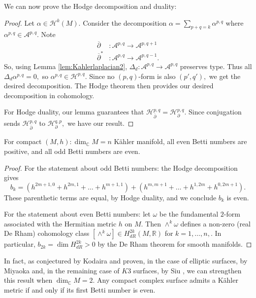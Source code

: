 \noindent We can now prove the Hodge decomposition and duality:

\begin{proof}
    Let $\alpha \in \mathcal{H}^k(M).$ Consider the decomposition $\alpha = \sum_{p+q = k} \alpha^{p,q}$ where $\alpha^{p,q} \in \mathcal{A}^{p,q}.$ Note
    \begin{align*}
    \overline\partial &: \mathcal{A}^{p,q} \rightarrow \mathcal{A}^{p,q+1}\\
    \overline\partial^* &: \mathcal{A}^{p,q} \rightarrow \mathcal{A}^{p,q-1}.
    \end{align*}
    So, using Lemma \ref{lem:Kahlerlaplacian2}, $\Delta_d:\mathcal{A}^{p,q} \rightarrow \mathcal{A}^{p,q}$ preserves type. Thus all $\Delta_d \alpha^{p,q} = 0,$ so $\alpha^{p,q}\in \mathcal{H}^{p,q}.$ Since no $(p,q)$-form is also $(p',q'),$ we get the desired decomposition. The Hodge theorem then provides our desired decomposition in cohomology.

    For Hodge duality, our lemma guarantees that $\mathcal{H}^{p,q}_{\overline\partial} = \mathcal{H}^{p,q}_{\partial}.$ Since conjugation sends $\mathcal{H}^{p,q}_{\overline\partial}$ to $\mathcal{H}^{q,p}_{\partial},$ we have our result.
\end{proof}


\begin{theorem}\label{thm:Betti}
    For compact $(M,h): \dim_\mathbb{C} M= n$ K\"ahler manifold, all even Betti numbers are positive, and all odd Betti numbers are even.
\end{theorem}

\begin{proof}
    For the statement about odd Betti numbers: the Hodge decomposition gives
    \[
    b_k = (h^{2m + 1, 0} + h^{2m, 1} + \dots + h^{m+1, 1}) + (h^{m,m+1} + \dots + h^{1, 2m} + h^{0,2m+1}).
    \]
    These parenthetic terms are equal, by Hodge duality, and we conclude $b_k$ is even.

    For the statement about even Betti numbers: let $\omega$ be the fundamental $2$-form associated with the Hermitian metric $h$ on $M.$ Then $\wedge^k \omega$ defines a non-zero (real De Rham) cohomology class $[\wedge^k \omega] \in H^{2k}_{dR}(M, \mathbb{R})$ for $k = 1, \dots, n,.$ In particular, $b_{2k} = \dim H^{2k}_{dR}> 0$ by the De Rham theorem for smooth manifolds.
\end{proof}

In fact, as conjectured by Kodaira and proven, in the case of elliptic surfaces, by Miyaoka \cite{Miyaoka1974} and, in the remaining case of $K3$ surfaces, by Siu \cite{Siu1983}, we can strengthen this result when $\dim_\mathbb{C}M = 2.$ Any compact complex surface admits a K\"ahler metric if and only if its first Betti number is even.


